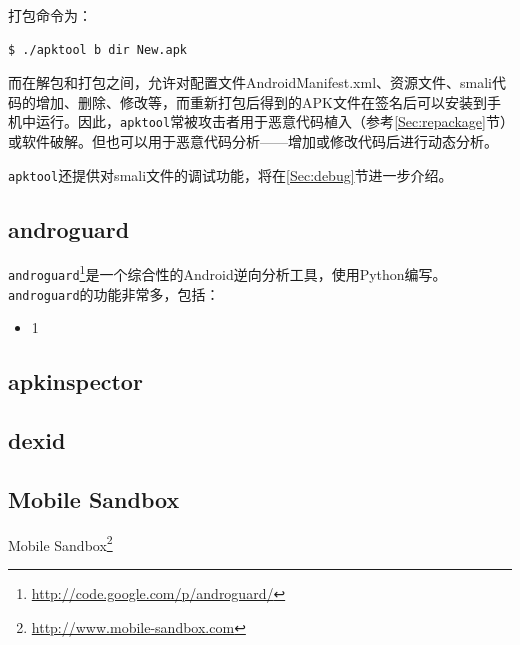 打包命令为：
\begin{lstlisting}[language=bash, numbers=none]
 $ ./apktool b dir New.apk
\end{lstlisting}

而在解包和打包之间，允许对配置文件AndroidManifest.xml、资源文件、smali代码的增加、删除、修改等，而重新打包后得到的APK文件在签名后可以安装到手机中运行。因此，\lstinline!apktool!常被攻击者用于恶意代码植入（参考\ref{Sec:repackage}节）或软件破解。但也可以用于恶意代码分析——增加或修改代码后进行动态分析。

\lstinline!apktool!还提供对smali文件的调试功能，将在\ref{Sec:debug}节进一步介绍。

\subsection{androguard}
\lstinline!androguard!\footnote{\url{http://code.google.com/p/androguard/}}是一个综合性的Android逆向分析工具，使用Python编写。\lstinline!androguard!的功能非常多，包括：
\begin{itemize}
  \item 1
\end{itemize}

\subsection{apkinspector}

\subsection{dexid}
\subsection{Mobile Sandbox}
Mobile Sandbox\footnote{\url{http://www.mobile-sandbox.com}}
